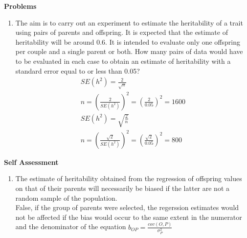\documentclass[12pt]{amsart}
\begin{document}
{\large \bf Problems}   
\begin{enumerate}
\item The aim is to carry out an experiment to estimate the heritability of a trait using pairs of parents and offspring. It is expected that the estimate of heritability will be around 0.6. It is intended to evaluate only one offspring per couple and a single parent or both. How many pairs of data would have to be evaluated in each case to obtain an estimate of heritability with a standard error equal to or less than 0.05?
\begin{gather*}
SE(h^2) = \frac{2}{\sqrt{n}} \\
n = (\frac{2}{SE(h^2)})^2 = (\frac{2}{0.05})^2 = 1600\\
SE(h^2) = \sqrt{\frac{2}{n}}\\
n = (\frac{\sqrt{2}}{SE(h^2)})^2 = (\frac{\sqrt{2}}{0.05})^2 = 800
\end{gather*}

\end{enumerate}

{\large \bf Self Assessment}
\begin{enumerate}
\item The estimate of heritability obtained from the regression of offspring values on that of their parents will necessarily be biased if the latter are not a random sample of the population.\\
False, if the group of parents were selected, the regerssion estimates would not be affected if the bias would occur to the same extent in the numerator and the denominator of the equation $b_{OP} = \frac{cov(O,P)}{\sigma^2_P}$\\

\end{enumerate}


\medskip
\end{document}
